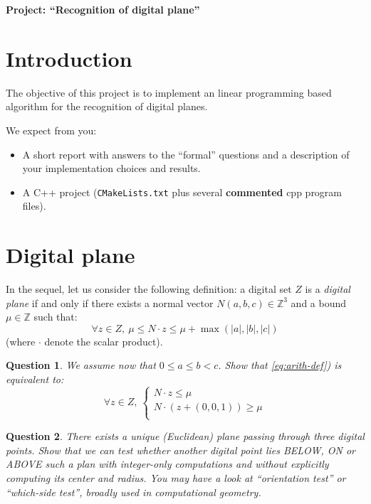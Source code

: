\documentclass[a4paper, 11pt]{article}
\title{}
\author{}
\date{}
\newtheorem{qu}{Question}
\begin{document}
\begin{center}
	\LARGE \textbf{Project: ``Recognition of digital plane''}
\end{center}

\section*{Introduction}

The objective of this project is to implement an linear programming based algorithm
for the recognition of digital planes. 

We expect from you:
\begin{itemize}
\item A short report with answers to the ``formal'' questions and a
  description of your implementation choices and results.
\item A C++ project (\texttt{CMakeLists.txt} plus several
  \textbf{commented} cpp program files).
\end{itemize}


\section{Digital plane}

In the sequel, let us consider the following definition: 
a digital set $Z$ is a \emph{digital plane} if and only if 
there exists a normal vector $N(a,b,c) \in \mathbb{Z}^3$ and 
a bound $\mu \in \mathbb{Z}$ such that:
\begin{equation}
\label{eq:arith-def}
    \forall z \in Z, \: \mu \leq N \cdot z \leq \mu + \max{(|a|,|b|,|c|)}
\end{equation}
(where $\cdot$ denote the scalar product). 

\begin{qu}
We assume now that $0 \leq a \leq b < c$. 
Show that \ref{eq:arith-def}) is equivalent to: 
\begin{equation}
\forall z \in Z, \:
  \left\{
  \begin{array}{l}
     N \cdot z \leq \mu  \\
     N \cdot (z+(0,0,1)) \geq \mu  \\
  \end{array}
  \right.
\end{equation}
\end{qu}


\begin{qu}
There exists a unique (Euclidean) plane passing through three digital points. Show that we can test whether another digital
point lies BELOW, ON or ABOVE such a plan with integer-only computations and without explicitly computing 
its center and radius. You may have a look at ``orientation test'' or ``which-side test'', broadly used in computational geometry. 
\end{qu}
\end{document}
